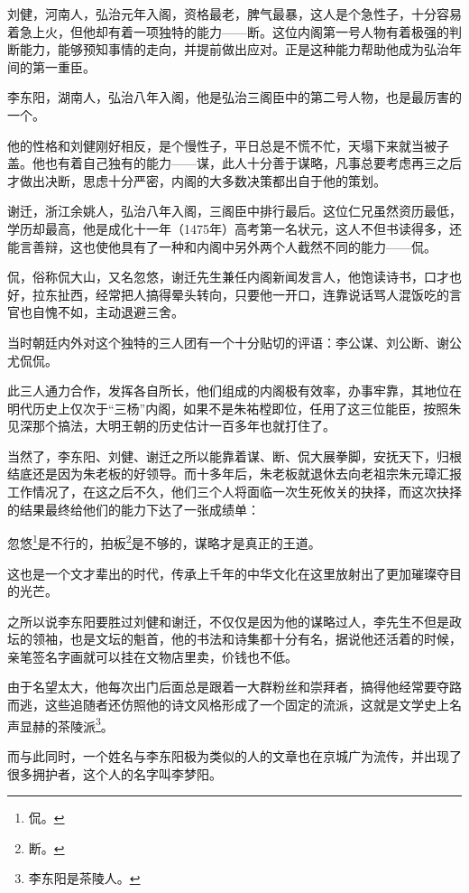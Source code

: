 \begin{multicols}{\theparacolNo}
刘健，河南人，弘治元年入阁，资格最老，脾气最暴，这人是个急性子，十分容易着急上火，但他却有着一项独特的能力——断。这位内阁第一号人物有着极强的判断能力，能够预知事情的走向，并提前做出应对。正是这种能力帮助他成为弘治年间的第一重臣。

李东阳，湖南人，弘治八年入阁，他是弘治三阁臣中的第二号人物，也是最厉害的一个。

他的性格和刘健刚好相反，是个慢性子，平日总是不慌不忙，天塌下来就当被子盖。他也有着自己独有的能力——谋，此人十分善于谋略，凡事总要考虑再三之后才做出决断，思虑十分严密，内阁的大多数决策都出自于他的策划。

谢迁，浙江余姚人，弘治八年入阁，三阁臣中排行最后。这位仁兄虽然资历最低，学历却最高，他是成化十一年（1475年）高考第一名状元，这人不但书读得多，还能言善辩，这也使他具有了一种和内阁中另外两个人截然不同的能力——侃。

侃，俗称侃大山，又名忽悠，谢迁先生兼任内阁新闻发言人，他饱读诗书，口才也好，拉东扯西，经常把人搞得晕头转向，只要他一开口，连靠说话骂人混饭吃的言官也自愧不如，主动退避三舍。

当时朝廷内外对这个独特的三人团有一个十分贴切的评语：李公谋、刘公断、谢公尤侃侃。

此三人通力合作，发挥各自所长，他们组成的内阁极有效率，办事牢靠，其地位在明代历史上仅次于“三杨”内阁，如果不是朱祐樘即位，任用了这三位能臣，按照朱见深那个搞法，大明王朝的历史估计一百多年也就打住了。

当然了，李东阳、刘健、谢迁之所以能靠着谋、断、侃大展拳脚，安抚天下，归根结底还是因为朱老板的好领导。而十多年后，朱老板就退休去向老祖宗朱元璋汇报工作情况了，在这之后不久，他们三个人将面临一次生死攸关的抉择，而这次抉择的结果最终给他们的能力下达了一张成绩单：

忽悠\footnote{侃。}是不行的，拍板\footnote{断。}是不够的，谋略才是真正的王道。

这也是一个文才辈出的时代，传承上千年的中华文化在这里放射出了更加璀璨夺目的光芒。

之所以说李东阳要胜过刘健和谢迁，不仅仅是因为他的谋略过人，李先生不但是政坛的领袖，也是文坛的魁首，他的书法和诗集都十分有名，据说他还活着的时候，亲笔签名字画就可以挂在文物店里卖，价钱也不低。

由于名望太大，他每次出门后面总是跟着一大群粉丝和崇拜者，搞得他经常要夺路而逃，这些追随者还仿照他的诗文风格形成了一个固定的流派，这就是文学史上名声显赫的茶陵派\footnote{李东阳是茶陵人。}。

而与此同时，一个姓名与李东阳极为类似的人的文章也在京城广为流传，并出现了很多拥护者，这个人的名字叫李梦阳。


\end{multicols}
